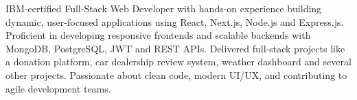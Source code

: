 

\begin{cvparagraph}

\textsf{IBM-certified Full-Stack Web Developer with hands-on experience building dynamic, user-focused applications using React, Next.js, Node.js and Express.js. Proficient in developing responsive frontends and scalable backends with MongoDB, PostgreSQL, JWT and REST APIs. Delivered full-stack projects like a donation platform, car dealership review system, weather dashboard and several other projects. Passionate about clean code, modern UI/UX, and contributing to agile development teams.}

\end{cvparagraph}
